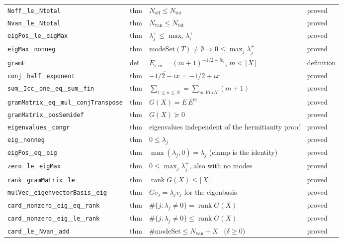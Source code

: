\documentclass[11pt,a4paper]{article}
\newcommand{\lb}{\_\allowbreak}
\theoremstyle{definition}
\theoremstyle{remark}
\begin{document}
\begin{longtable}{@{}p{3.75cm}p{1.52cm}p{8.38cm}p{1.45cm}@{}}
\texttt{Noff}\lb\texttt{le}\lb\texttt{Ntotal} & thm & $N_{\mathrm{off}}\le N_{\mathrm{tot}}$ & proved\\
\texttt{Nvan}\lb\texttt{le}\lb\texttt{Ntotal} & thm & $N_{\mathrm{van}}\le N_{\mathrm{tot}}$ & proved\\
\texttt{eigPos}\lb\texttt{le}\lb\texttt{eigMax} & thm & $\lambda_j^{+}\le\max_i\lambda_i^{+}$ & proved\\
\texttt{eigMax}\lb\texttt{nonneg} & thm & $\mathrm{modeSet}(T)\neq\emptyset\Rightarrow 0\le\max_j\lambda_j^{+}$ & proved\\
\texttt{gramE} & def & $E_{i,m}=(m+1)^{-1/2-i b_i}$, $m<\lfloor X\rfloor$ & definition\\
\texttt{conj}\lb\texttt{half}\lb\texttt{exponent} & thm & $\overline{-1/2-ix}=-1/2+ix$ & proved\\
\texttt{sum}\lb\texttt{Icc}\lb\texttt{one}\lb\texttt{eq}\lb\texttt{sum}\lb\texttt{fin} & thm & $\sum_{1\le n\le N}=\sum_{m:\mathrm{Fin}\,N}(m+1)$ & proved\\
\texttt{gramMatrix}\lb\texttt{eq}\lb\texttt{mul}\lb\texttt{conjTranspose} & thm & $G(X)=E\,E^{\mathsf H}$ & proved\\
\texttt{gramMatrix}\lb\texttt{posSemidef} & thm & $G(X)\succeq0$ & proved\\
\texttt{eigenvalues}\lb\texttt{congr} & thm & eigenvalues independent of the hermitianity proof & proved\\
\texttt{eig}\lb\texttt{nonneg} & thm & $0\le\lambda_j$ & proved\\
\texttt{eigPos}\lb\texttt{eq}\lb\texttt{eig} & thm & $\max(\lambda_j,0)=\lambda_j$ (clamp is the identity) & proved\\
\texttt{zero}\lb\texttt{le}\lb\texttt{eigMax} & thm & $0\le\max_j\lambda_j^{+}$, also with no modes & proved\\
\texttt{rank}\lb\texttt{gramMatrix}\lb\texttt{le} & thm & $\operatorname{rank}G(X)\le\lfloor X\rfloor$ & proved\\
\texttt{mulVec}\lb\texttt{eigenvectorBasis}\lb\texttt{eig} & thm & $G v_j=\lambda_j v_j$ for the eigenbasis & proved\\
\texttt{card}\lb\texttt{nonzero}\lb\texttt{eig}\lb\texttt{eq}\lb\texttt{rank} & thm & $\#\{j:\lambda_j\ne0\}=\operatorname{rank}G(X)$ & proved\\
\texttt{card}\lb\texttt{nonzero}\lb\texttt{eig}\lb\texttt{le}\lb\texttt{rank} & thm & $\#\{j:\lambda_j\ne0\}\le\operatorname{rank}G(X)$ & proved\\
\texttt{card}\lb\texttt{le}\lb\texttt{Nvan}\lb\texttt{add} & thm & $\#\mathrm{modeSet}\le N_{\mathrm{van}}+X$ \ ($\delta\ge0$) & proved\\

\end{longtable}
\end{document}
